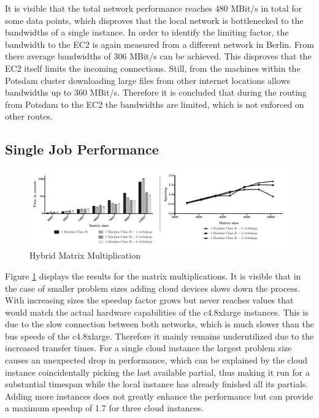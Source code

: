 It is visible that the total network performance reaches 480 MBit/s in total for some data points, which disproves that the local network is bottlenecked to the bandwidths of a single instance. In order to identify the limiting factor, the bandwidth to the EC2 is again measured from a different network in Berlin. From there average bandwidths of 306 MBit/s can be achieved. This disproves that the EC2 itself limits the incoming connections. Still, from the machines within the Potsdam cluster downloading large files from other internet locations allows bandwidths up to 360 MBit/s. Therefore it is concluded that during the routing from Potsdam to the EC2 the bandwidths are limited, which is not enforced on other routes.

\subsection*{Single Job Performance}

\begin{figure}[H]
	\includegraphics[width=1.0\textwidth]{images/hybrid_matrix_multiplication.pdf}
	\centering
	\caption{Hybrid Matrix Multiplication}
	\label{img:hybrid_matrix_multiplication}
\end{figure}

Figure \ref{img:hybrid_matrix_multiplication} displays the results for the matrix multiplications. It is visible that in the case of smaller problem sizes adding cloud devices slows down the process. With increasing sizes the speedup factor grows but never reaches values that would match the actual hardware capabilities of the c4.8xlarge instances. This is due to the slow connection between both networks, which is much slower than the bus speeds of the c4.8xlarge. Therefore it mainly remains underutilized due to the increased transfer times. For a single cloud instance the largest problem size causes an unexpected drop in performance, which can be explained by the cloud instance coincidentally picking the last available partial, thus making it run for a substantial timespan while the local instance has already finished all its partials. Adding more instances does not greatly enhance the performance but can provide a maximum speedup of 1.7 for three cloud instances.


